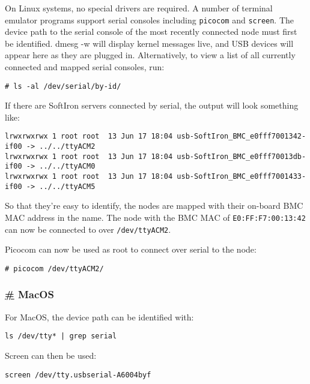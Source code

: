 On Linux systems, no special drivers are required. A number of terminal
emulator programs support serial consoles including \texttt{picocom} and
\texttt{screen}. The device path to the serial console of the most
recently connected node must first be identified. dmesg -w will display
kernel messages live, and USB devices will appear here as they are
plugged in. Alternatively, to view a list of all currently connected and
mapped serial consoles, run:

\begin{verbatim}
# ls -al /dev/serial/by-id/
\end{verbatim}

If there are SoftIron servers connected by serial, the output will look
something like:

\begin{verbatim}
lrwxrwxrwx 1 root root  13 Jun 17 18:04 usb-SoftIron_BMC_e0fff7001342-if00 -> ../../ttyACM2
lrwxrwxrwx 1 root root  13 Jun 17 18:04 usb-SoftIron_BMC_e0fff70013db-if00 -> ../../ttyACM0
lrwxrwxrwx 1 root root  13 Jun 17 18:04 usb-SoftIron_BMC_e0fff7001433-if00 -> ../../ttyACM5
\end{verbatim}

So that they're easy to identify, the nodes are mapped with their
on-board BMC MAC address in the name. The node with the BMC MAC of
\texttt{E0:FF:F7:00:13:42} can now be connected to over
\texttt{/dev/ttyACM2}.

Picocom can now be used as root to connect over serial to the node:

\begin{verbatim}
# picocom /dev/ttyACM2/
\end{verbatim}

\hypertarget{macos}{%
\subsubsection{\texorpdfstring{\protect\hyperlink{macos}{\#}
MacOS}{\# MacOS}}\label{macos}}

For MacOS, the device path can be identified with:

\begin{verbatim}
ls /dev/tty* | grep serial
\end{verbatim}

Screen can then be used:

\begin{verbatim}
screen /dev/tty.usbserial-A6004byf
\end{verbatim}

